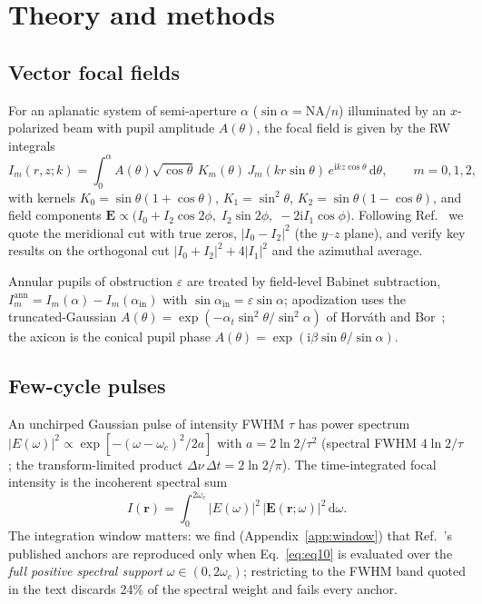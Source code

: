 \documentclass[11pt]{article}
\begin{document}
\section{Theory and methods}\label{sec:methods}

\subsection{Vector focal fields}
For an aplanatic system of semi-aperture $\alpha$ ($\sin\alpha=\mathrm{NA}/n$)
illuminated by an $x$-polarized beam with pupil amplitude $A(\theta)$, the
focal field is given by the RW integrals~\cite{RichardsWolf1959}
\begin{equation}
I_m(r,z;k)=\int_0^{\alpha}\! A(\theta)\sqrt{\cos\theta}\,
K_m(\theta)\, J_m(kr\sin\theta)\, e^{\mathrm{i}kz\cos\theta}\,\mathrm{d}\theta,
\qquad m=0,1,2,
\label{eq:rw}
\end{equation}
with kernels $K_0=\sin\theta(1{+}\cos\theta)$, $K_1=\sin^2\theta$,
$K_2=\sin\theta(1{-}\cos\theta)$, and field components
$\mathbf{E}\propto\big(I_0+I_2\cos2\phi,\; I_2\sin2\phi,\;
-2\mathrm{i}I_1\cos\phi\big)$. Following Ref.~\cite{Romallosa2003} we quote the
meridional cut with true zeros, $|I_0-I_2|^2$ (the $y$--$z$ plane), and verify
key results on the orthogonal cut $|I_0{+}I_2|^2{+}4|I_1|^2$ and the azimuthal
average.

Annular pupils of obstruction $\varepsilon$ are treated by field-level Babinet
subtraction, $I_m^{\mathrm{ann}}=I_m(\alpha)-I_m(\alpha_{\mathrm{in}})$ with
$\sin\alpha_{\mathrm{in}}=\varepsilon\sin\alpha$; apodization uses the
truncated-Gaussian $A(\theta)=\exp(-\alpha_t\sin^2\theta/\sin^2\alpha)$ of
Horv\'ath and Bor~\cite{HorvathBor2003}; the axicon is the conical pupil phase
$A(\theta)=\exp(\mathrm{i}\beta\sin\theta/\sin\alpha)$.

\subsection{Few-cycle pulses}
An unchirped Gaussian pulse of intensity FWHM $\tau$ has power spectrum
$|E(\omega)|^2\propto\exp[-(\omega-\omega_c)^2/2a]$ with $a=2\ln2/\tau^2$
(spectral FWHM $4\ln2/\tau$; the transform-limited product
$\Delta\nu\,\Delta t=2\ln2/\pi$). The time-integrated focal intensity is the
incoherent spectral sum~\cite{Romallosa2003}
\begin{equation}
I(\mathbf{r})=\int_0^{2\omega_c}\! |E(\omega)|^2\,
\big|\mathbf{E}(\mathbf{r};\omega)\big|^2\,\mathrm{d}\omega .
\label{eq:eq10}
\end{equation}
The integration window matters: we find (Appendix~\ref{app:window}) that
Ref.~\cite{Romallosa2003}'s published anchors are reproduced only when
Eq.~\eqref{eq:eq10} is evaluated over the \emph{full positive spectral support}
$\omega\in(0,2\omega_c)$; restricting to the FWHM band quoted in the text
discards 24\% of the spectral weight and fails every anchor.
\end{document}
